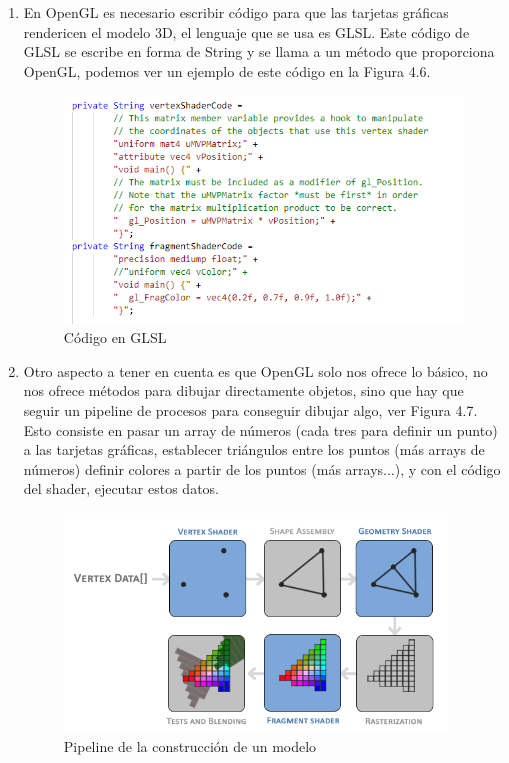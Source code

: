 \begin{enumerate}
    \item En OpenGL es necesario escribir código para que las tarjetas gráficas rendericen el modelo 3D,
    el lenguaje que se usa es GLSL. Este código de GLSL se escribe en forma de String y se llama a un método 
    que proporciona OpenGL, podemos ver un ejemplo de este código en la Figura 4.6.
    \begin{figure}[H]
        \centering
        \includegraphics[width=5in]{figures/GLSL.png}
        \caption{Código en GLSL}
    \end{figure}
    \newpage    
    \item Otro aspecto a tener en cuenta es que OpenGL solo nos ofrece lo básico, no nos ofrece métodos para dibujar 
    directamente objetos, sino que hay que seguir un pipeline de procesos para conseguir dibujar algo, ver Figura 4.7.
    Esto consiste en pasar un array de números (cada tres para definir un punto) 
    a las tarjetas gráficas, establecer triángulos entre los puntos (más arrays de números) 
    definir colores a partir de los puntos (más arrays...), y con el código del shader, ejecutar 
    estos datos.
    \begin{figure}
        \centering
        \includegraphics[width=4in]{figures/pipeline.png}
        \caption{Pipeline de la construcción de un modelo}

\end{figure}
\end{enumerate}
